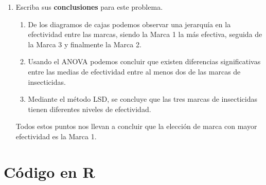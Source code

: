 \documentclass[12pt,a4paper]{article}
\begin{document}
\begin{enumerate}
  Todas las comparaciones por pares son estadísticamente significativas, por lo que se concluye que las tres marcas de insecticidas tienen diferentes niveles de efectividad. 

  \item Escriba sus \textbf{conclusiones} para este problema.
  \begin{enumerate}
    \item De los diagramos de cajas podemos observar una jerarquía en la efectividad entre las marcas, siendo la Marca 1 la más efectiva, seguida de la Marca 3 y finalmente la Marca 2.
    \item Usando el ANOVA podemos concluir que existen diferencias significativas entre las medias de efectividad entre al menos dos de las marcas de insecticidas.
    \item Mediante el método LSD, se concluye que las tres marcas de insecticidas tienen diferentes niveles de efectividad.
  \end{enumerate}
  Todos estos puntos nos llevan a concluir que la elección de marca con mayor efectividad es la Marca 1. 

\end{enumerate}

\newpage
\section*{Código en R}
\end{document}
